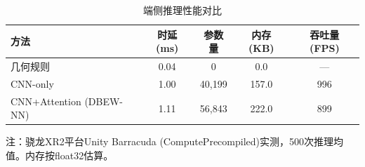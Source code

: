 \begin{table}[htbp]
  \centering
  \caption{端侧推理性能对比}
  \label{tab:gesture_performance}
  \small
  \setlength{\tabcolsep}{16pt}
  \begin{tabular}{lcccc}
  \hline
  方法 & 时延 (ms) & 参数量 & 内存 (KB) & 吞吐量 (FPS) \\
  \hline
  几何规则 & 0.04 & 0 & 0.0 & — \\
  CNN-only & 1.00 & 40,199 & 157.0 & 996 \\
  CNN+Attention (DBEW-NN) & 1.11 & 56,843 & 222.0 & 899 \\
  \hline
  \end{tabular}
  \noindent\begin{minipage}{\linewidth}\footnotesize
  注：骁龙XR2平台Unity Barracuda (ComputePrecompiled)实测，500次推理均值。内存按float32估算。
  \end{minipage}
\end{table}
